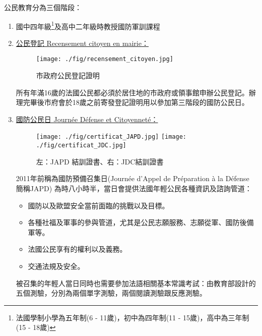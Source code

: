\documentclass[a4paper,14pt]{extarticle}
\theoremstyle{plain}
\theoremstyle{remark}
\numberwithin{equation}{section}
\begin{document}
\par 
公民教育分為三個階段：
\begin{enumerate}
	\item 國中四年級\footnote{法國學制小學為五年制(6 - 11歲)，初中為四年制(11 - 15歲)，高中為三年制(15 - 18歲)}及高中二年級時教授國防軍訓課程
	\item \underline{公民登記 Recensement citoyen en mairie：}	

		\begin{figure}[H]
      \centering
			\texttt{[image: ./fig/recensement\_citoyen.jpg]}
			\caption{市政府公民登記證明}
		\end{figure}
    所有年滿16歲的法國公民都必須於居住地的市政府或領事館申辦公民登記。辦理完畢後市府會於18歲之前寄發登記證明用以參加第三階段的國防公民日。

	\item \underline{國防公民日 Journée Défense et Citoyenneté：}
		\begin{figure}[H]
      \centering
			\texttt{[image: ./fig/certificat\_JAPD.jpg]}
			\texttt{[image: ./fig/certificat\_JDC.jpg]}
			\caption{左：JAPD 結訓證書、右：JDC結訓證書}
		\end{figure}

	2011年前稱為國防預備召集日(Journée d'Appel de Préparation à la Défense 簡稱JAPD)
		為時八小時半，當日會提供法國年輕公民各種資訊及諮詢管道：
\begin{itemize}
	\item 國防以及歐盟安全當前面臨的挑戰以及目標。
	\item 各種社福及軍事的參與管道，尤其是公民志願服務、志願從軍、國防後備軍等。
	\item 法國公民享有的權利以及義務。
	\item 交通法規及安全。
\end{itemize}


被召集的年輕人當日同時也需要參加法語相關基本常識考試：由教育部設計的五個測驗，分別為兩個單字測驗，兩個閱讀測驗跟反應測驗。

\end{enumerate}
\end{document}
